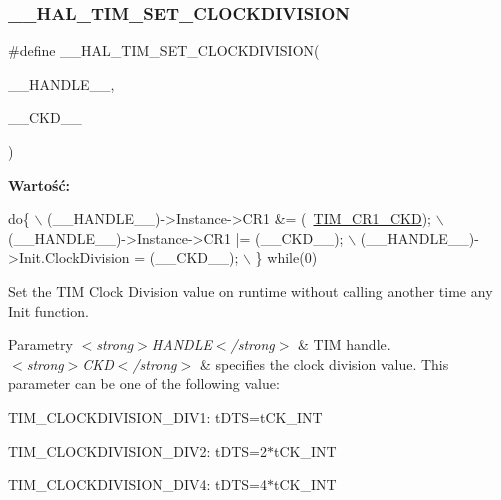 \subsubsection{\texorpdfstring{\+\_\+\+\_\+\+H\+A\+L\+\_\+\+T\+I\+M\+\_\+\+S\+E\+T\+\_\+\+C\+L\+O\+C\+K\+D\+I\+V\+I\+S\+I\+ON}{\_\_HAL\_TIM\_SET\_CLOCKDIVISION}}
{\footnotesize\ttfamily \#define \+\_\+\+\_\+\+H\+A\+L\+\_\+\+T\+I\+M\+\_\+\+S\+E\+T\+\_\+\+C\+L\+O\+C\+K\+D\+I\+V\+I\+S\+I\+ON(\begin{DoxyParamCaption}\item[{}]{\+\_\+\+\_\+\+H\+A\+N\+D\+L\+E\+\_\+\+\_\+,  }\item[{}]{\+\_\+\+\_\+\+C\+K\+D\+\_\+\+\_\+ }\end{DoxyParamCaption})}

{\bfseries Wartość\+:}
\begin{DoxyCode}
\textcolor{keywordflow}{do}\{                                                   \(\backslash\)
    (\_\_HANDLE\_\_)->Instance->CR1 &= (~\hyperlink{group___peripheral___registers___bits___definition_gacacc4ff7e5b75fd2e4e6b672ccd33a72}{TIM\_CR1\_CKD});  \(\backslash\)
    (\_\_HANDLE\_\_)->Instance->CR1 |= (\_\_CKD\_\_);       \(\backslash\)
    (\_\_HANDLE\_\_)->Init.ClockDivision = (\_\_CKD\_\_);   \(\backslash\)
  \} \textcolor{keywordflow}{while}(0)
\end{DoxyCode}


Set the T\+IM Clock Division value on runtime without calling another time any Init function. 


\begin{DoxyParams}{Parametry}
{\em $<$strong$>$\+H\+A\+N\+D\+L\+E$<$/strong$>$} & T\+IM handle. \\
\hline
{\em $<$strong$>$\+C\+K\+D$<$/strong$>$} & specifies the clock division value. This parameter can be one of the following value\+: \begin{DoxyItemize}
\item T\+I\+M\+\_\+\+C\+L\+O\+C\+K\+D\+I\+V\+I\+S\+I\+O\+N\+\_\+\+D\+I\+V1\+: t\+D\+TS=t\+C\+K\+\_\+\+I\+NT \item T\+I\+M\+\_\+\+C\+L\+O\+C\+K\+D\+I\+V\+I\+S\+I\+O\+N\+\_\+\+D\+I\+V2\+: t\+D\+TS=2$\ast$t\+C\+K\+\_\+\+I\+NT \item T\+I\+M\+\_\+\+C\+L\+O\+C\+K\+D\+I\+V\+I\+S\+I\+O\+N\+\_\+\+D\+I\+V4\+: t\+D\+TS=4$\ast$t\+C\+K\+\_\+\+I\+NT \end{DoxyItemize}
\\
\hline
\end{DoxyParams}

